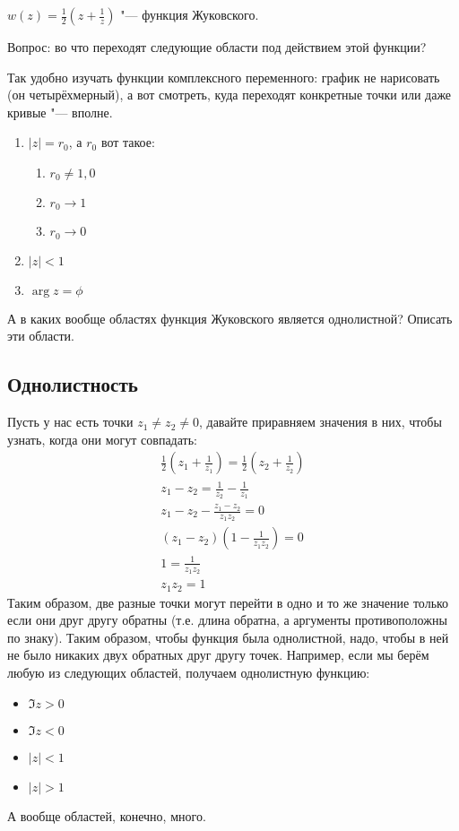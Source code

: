 	\begin{Def}
		$w(z) = \frac12 \left(z + \frac1z\right)$ "--- функция Жуковского.
	\end{Def}
	Вопрос: во что переходят следующие области под действием этой функции?
	\begin{Rem}
		Так удобно изучать функции комплексного переменного: график не нарисовать (он четырёхмерный),
		а вот смотреть, куда переходят конкретные точки или даже кривые "--- вполне.
	\end{Rem}
	\begin{enumerate}[label=\asbuk{enumi}.]
		\item $|z|=r_0$, а $r_0$ вот такое:
			\begin{enumerate}[label=\arabic*.]
			\item $r_0 \neq 1, 0$
			\item $r_0 \to 1$
			\item $r_0 \to 0$
			\end{enumerate}
		\item $|z|<1$
		\item $\arg z = \phi$
	\end{enumerate}
	
	А в каких вообще областях функция Жуковского является однолистной?
	Описать эти области.

	\subsection{Однолистность}
		Пусть у нас есть точки $z_1\neq z_2\neq0$, давайте приравняем значения в них, чтобы
		узнать, когда они могут совпадать:
		\begin{gather*}
			\frac 12 \left(z_1 + \frac1{z_1}\right) = \frac 12 \left(z_2 + \frac1{z_2}\right) \\
			z_1 - z_2 = \frac1{z_2} - \frac1{z_1} \\
			z_1 - z_2 - \frac{z_1-z_2}{z_1z_2} = 0 \\
			(z_1 - z_2)\left(1 - \frac{1}{z_1z_2}\right) = 0 \\
			1 = \frac{1}{z_1z_2} \\
			z_1z_2 = 1
		\end{gather*}
		Таким образом, две разные точки могут перейти в одно и то же значение только если
		они друг другу обратны (т.е. длина обратна, а аргументы противоположны по знаку).
		Таким образом, чтобы функция была однолистной, надо, чтобы в ней не было никаких
		двух обратных друг другу точек.
		Например, если мы берём любую из следующих областей, получаем однолистную функцию:
		\begin{itemize}
			\item $\Im z > 0$
			\item $\Im z < 0$
			\item $|z| < 1$
			\item $|z| > 1$
		\end{itemize}
		А вообще областей, конечно, много.

